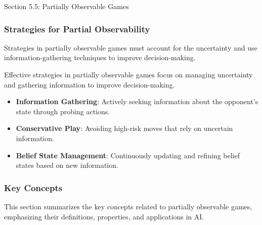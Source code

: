 \begin{notes}{Section 5.5: Partially Observable Games}
    \subsubsection*{Strategies for Partial Observability}
    
    Strategies in partially observable games must account for the uncertainty and use information-gathering techniques to improve decision-making.
    
    \begin{highlight}
        Effective strategies in partially observable games focus on managing uncertainty and gathering information to improve decision-making.
        
        \begin{itemize}
            \item \textbf{Information Gathering}: Actively seeking information about the opponent's state through probing actions.
            \item \textbf{Conservative Play}: Avoiding high-risk moves that rely on uncertain information.
            \item \textbf{Belief State Management}: Continuously updating and refining belief states based on new information.
        \end{itemize}
    \end{highlight}
    
    \subsubsection*{Key Concepts}
    
    \begin{highlight}
        This section summarizes the key concepts related to partially observable games, emphasizing their definitions, properties, and applications in AI.
        

\end{highlight}
\end{notes}
